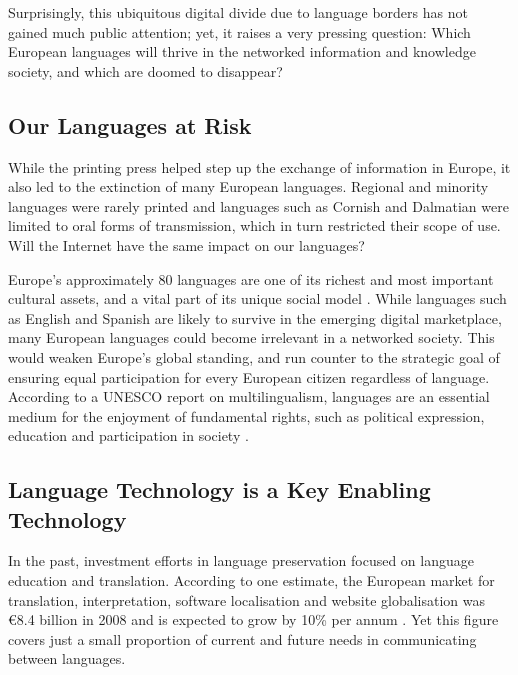 \begin{multicols}{2}
    Surprisingly, this ubiquitous digital divide due to language borders has not gained much public attention; yet, it raises a very pressing question: Which European languages will thrive in the networked information and knowledge society, and which are doomed to disappear?

\subsection{Our Languages at Risk}

    While the printing press helped step up the exchange of information in Europe, it also led to the extinction of many European languages. Regional and minority languages were rarely printed and languages such as Cornish and Dalmatian were limited to oral forms of transmission, which in turn restricted their scope of use. Will the Internet have the same impact on our languages?


    Europe’s approximately 80 languages are one of its richest and most important cultural assets, and a vital part of its unique social model \cite{CAT-Nota2}. While languages such as English and Spanish are likely to survive in the emerging digital marketplace, many European languages could become irrelevant in a networked society. This would weaken Europe’s global standing, and run counter to the strategic goal of ensuring equal participation for every European citizen regardless of language. According to a UNESCO report on multilingualism, languages are an essential medium for the enjoyment of fundamental rights, such as political expression, education and participation in society \cite{CAT-Nota3}.

\subsection{Language Technology is a Key Enabling Technology}

    In the past, investment efforts in language preservation focused on language education and translation. According to one estimate, the European market for translation, interpretation, software localisation and website globalisation was €8.4 billion in 2008 and is expected to grow by 10\% per annum \cite{CAT-Nota3}. Yet this figure covers just a small proportion of current and future needs in communicating between languages. 


\end{multicols}
